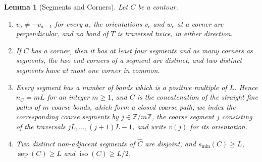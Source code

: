 \documentclass[11pt]{article}
\newcommand{\iso}{\operatorname{iso}}
\newcommand{\sep}{\operatorname{sep}}
\numberwithin{equation}{section}
\newtheorem{lemma}[theorem]{Lemma}
\theoremstyle{remark}
\theoremstyle{plain}
\begin{document}
\begin{lemma}[Segments and Corners]\label{lem:torus-segments}
Let $C$ be a contour.
\begin{enumerate}[label=(\alph*)]
    \item $v_a\neq -v_{a-1}$ for every $a$, the orientations $v_c$ and $w_c$ at a corner are perpendicular, and no bond of $T$ is traversed twice, in either direction.
    \item If $C$ has a corner, then it has at least four segments and as many corners as segments, the two end corners of a segment are distinct, and two distinct segments have at most one corner in common.
    \item Every segment has a number of bonds which is a positive multiple of $L$. Hence $n_C= mL$ for an integer $m\geqslant 1$, and $C$ is the concatenation of the straight fine paths of $m$ coarse bonds, which form a closed coarse path; we index the corresponding coarse segments by $j\in\mathbb Z/m\mathbb Z$, the coarse segment $j$ consisting of the traversals $jL,\ldots,(j+1)L-1$, and write $v(j)$ for its orientation.
    \item Two distinct non-adjacent segments of $\widehat C$ are disjoint, and $s_{\min}(C)\geqslant L$, $\sep(C)\geqslant L$ and $\iso(C)\geqslant L/2$.
\end{enumerate}
\end{lemma}
\end{document}

